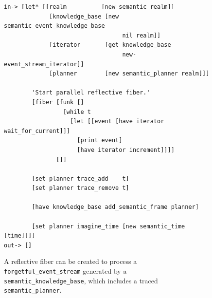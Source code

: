 \begin{figure}[h]
\centering
{\scriptsize
\begin{Verbatim}[frame=single]
 in-> [let* [[realm          [new semantic_realm]]
             [knowledge_base [new semantic_event_knowledge_base
                                  nil realm]]
             [iterator       [get knowledge_base
                                  new-event_stream_iterator]]
             [planner        [new semantic_planner realm]]]

        'Start parallel reflective fiber.'
        [fiber [funk []
                 [while t
                   [let [[event [have iterator wait_for_current]]]
                     [print event]
                     [have iterator increment]]]]
               []]
        
        [set planner trace_add    t]
        [set planner trace_remove t]
        
        [have knowledge_base add_semantic_frame planner]
        
        [set planner imagine_time [new semantic_time [time]]]]
out-> []
\end{Verbatim}
}
\caption[A reflective fiber can be created to process an
  {\tt{forgetful\_event\_stream}}.]{A reflective fiber can be created
  to process a {\tt{forgetful\_event\_stream}} generated by a
  {\tt{semantic\_knowledge\_base}}, which includes a traced
  {\tt{semantic\_planner}}.}
\label{figure:reflective_fiber}
\end{figure}


